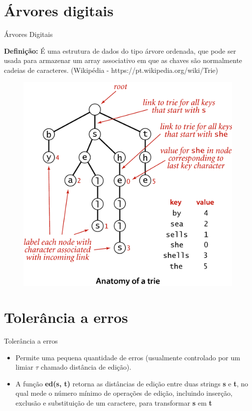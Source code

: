 \documentclass[11pt]{beamer}
\begin{document}
\section{Árvores digitais}

\begin{frame}[fragile]{Árvores Digitais}

    \textbf{Definição:} É uma estrutura de dados do tipo árvore ordenada, que pode ser usada para armazenar um array associativo em que as chaves são normalmente cadeias de caracteres. (Wikipédia - https://pt.wikipedia.org/wiki/Trie)

    \pause
    \begin{figure}
      \includegraphics[scale=0.13]{pictures/trie_anatomy.png}
      \centering
    \end{figure}

\end{frame}

\section{Tolerância a erros}

\begin{frame}{Tolerância a erros}
	\begin{itemize}
	    \justifying
		\item Permite uma pequena quantidade de erros (usualmente controlado por um limiar $\tau$ chamado distância de edição). \pause
		\item A função \textbf{ed(s, t)} retorna as distâncias de edição entre duas strings \textbf{s} e \textbf{t}, no qual mede o número mínimo de operações de edição, incluindo inserção, exclusão e substituição de um caractere, para transformar \textbf{s} em \textbf{t}
	\end{itemize}
\end{frame}
\end{document}
